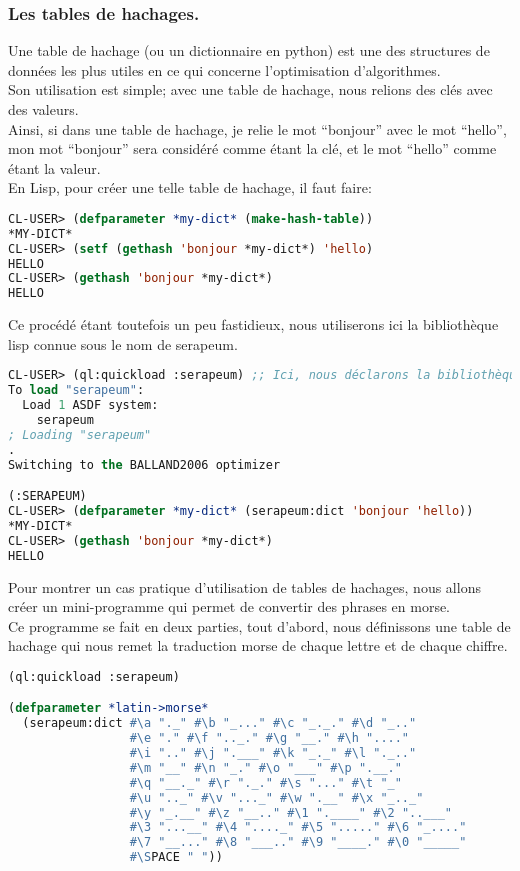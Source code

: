\documentclass[a4paper, 12pt]{article}
\numberwithin{equation}{subsection}
\begin{document}
\subsubsection{Les tables de hachages.}
Une table de hachage (ou un dictionnaire en python) est une des structures de données les plus utiles en ce qui concerne l'optimisation d'algorithmes. \\
Son utilisation est simple; avec une table de hachage, nous relions des clés avec des valeurs. \\ Ainsi, si dans une table de hachage, je relie le mot ``bonjour'' avec le mot ``hello'', mon mot ``bonjour'' sera considéré comme étant la clé, et le mot ``hello'' comme étant la valeur. \\
En Lisp, pour créer une telle table de hachage, il faut faire: \\
\begin{lstlisting}[language=Lisp]
CL-USER> (defparameter *my-dict* (make-hash-table))
*MY-DICT*
CL-USER> (setf (gethash 'bonjour *my-dict*) 'hello)
HELLO
CL-USER> (gethash 'bonjour *my-dict*)
HELLO
\end{lstlisting}
Ce procédé étant toutefois un peu fastidieux, nous utiliserons ici la bibliothèque lisp connue sous le nom de serapeum. \\
\begin{lstlisting}[language=Lisp]
CL-USER> (ql:quickload :serapeum) ;; Ici, nous déclarons la bibliothèque.
To load "serapeum":
  Load 1 ASDF system:
    serapeum
; Loading "serapeum"
.
Switching to the BALLAND2006 optimizer

(:SERAPEUM)
CL-USER> (defparameter *my-dict* (serapeum:dict 'bonjour 'hello))
*MY-DICT*
CL-USER> (gethash 'bonjour *my-dict*)
HELLO
\end{lstlisting}
Pour montrer un cas pratique d'utilisation de tables de hachages, nous allons créer un mini-programme qui permet de convertir des phrases en morse. \\
Ce programme se fait en deux parties, tout d'abord, nous définissons une table de hachage qui nous remet la traduction morse de chaque lettre et de chaque chiffre. \\
\begin{lstlisting}[language=Lisp]
(ql:quickload :serapeum)

(defparameter *latin->morse*
  (serapeum:dict #\a "._" #\b "_..." #\c "_._." #\d "_.."
                 #\e "." #\f ".._." #\g "__." #\h "...."
                 #\i ".." #\j ".___" #\k "_._" #\l "._.."
                 #\m "__" #\n "_." #\o "___" #\p ".__."
                 #\q "__._" #\r "._." #\s "..." #\t "_"
                 #\u ".._" #\v "..._" #\w ".__" #\x "_.._"
                 #\y "_.__" #\z "__.." #\1 ".____" #\2 "..___"
                 #\3 "...__" #\4 "...._" #\5 "....." #\6 "_...."
                 #\7 "__..." #\8 "___.." #\9 "____." #\0 "_____"
                 #\SPACE " "))
\end{lstlisting}
\end{document}
